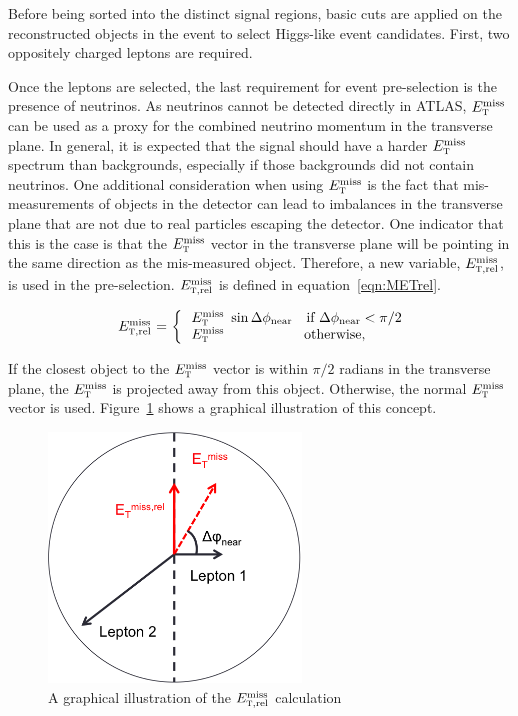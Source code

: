 Before being sorted into the distinct signal regions, basic cuts are applied on the reconstructed objects in the event to select Higgs-like event candidates. First, two oppositely charged leptons are required. 

Once the leptons are selected, the last requirement for event pre-selection is the presence of neutrinos. As neutrinos cannot be detected directly in ATLAS, $E_{\textrm{\footnotesize\sc t}}^{\rm miss}$ can be used as a proxy for the combined neutrino momentum in the transverse plane. In general, it is expected that the signal should have a harder $E_{\textrm{\footnotesize\sc t}}^{\rm miss}$ spectrum than backgrounds, especially if those backgrounds did not contain neutrinos. One additional consideration when using $E_{\textrm{\footnotesize\sc t}}^{\rm miss}$ is the fact that mis-measurements of objects in the detector can lead to imbalances in the transverse plane that are not due to real particles escaping the detector. One indicator that this is the case is that the $E_{\textrm{\footnotesize\sc t}}^{\rm miss}$ vector in the transverse plane will be pointing in the same direction as the mis-measured object. Therefore, a new variable, $E_{{\textrm{\footnotesize\sc t}},{\rm rel}}^{\rm miss}$, is used in the pre-selection. $E_{{\textrm{\footnotesize\sc t}},{\rm rel}}^{\rm miss}$ is defined in equation~\ref{eqn:METrel}. 

\begin{equation}
  \begin{array}{ll}
  \multirow{2}{*}{$\METrel$ =\ \bigg\{ }
    &\!\!\!\!\MET\ \sin\dphiNear\quad\textrm{if $\dphiNear<\pi/2$}\\
    &\!\!\!\!\MET\ \phantom{\sin\dphiNear}\quad\textrm{otherwise,}
  \end{array}
\label{eqn:METrel}
\end{equation}

If the closest object to the $E_{\textrm{\footnotesize\sc t}}^{\rm miss}$ vector is within $\pi/2$ radians in the transverse plane, the $E_{\textrm{\footnotesize\sc t}}^{\rm miss}$ is projected away from this object. Otherwise, the normal $E_{\textrm{\footnotesize\sc t}}^{\rm miss}$ vector is used. Figure~\ref{fig:METrel} shows a graphical illustration of this concept. 

\begin{figure}[h!]
  \centering
  \captionsetup{justification=centering}

  \includegraphics[width=0.6\textwidth]{figures/METrel_cartoon}
  \caption{A graphical illustration of the $E_{{\textrm{\footnotesize\sc t}},{\rm rel}}^{\rm miss}$ calculation}
  \label{fig:METrel}
\end{figure}

